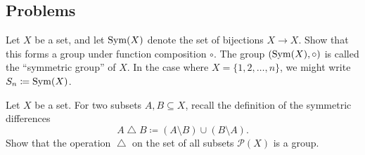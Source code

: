 \documentclass[../main.tex]{subfiles}
\begin{document}


\subsection{Problems}


\begin{homework} \label{prop:sym-groups}
    Let $X$ be a set, and let $\operatorname{Sym}(X)$ denote the set of bijections $X\to X$. Show that this forms a group under function composition $\circ$. The group $(\operatorname{Sym}(X),\circ)$ is called the ``symmetric group'' of $X$. In the case where $X=\{1,2,\ldots,n\}$, we might write $S_n\coloneqq\operatorname{Sym}(X)$.
\end{homework}

\begin{homework}
    Let $X$ be a set. For two subsets $A,B\subseteq X$, recall the definition of the symmetric differences
    \[A\operatorname{\triangle}B\coloneqq(A\setminus B)\cup(B\setminus A).\]
    Show that the operation $\operatorname{\triangle}$ on the set of all subsets $\mathcal P(X)$ is a group.
\end{homework}
\end{document}
